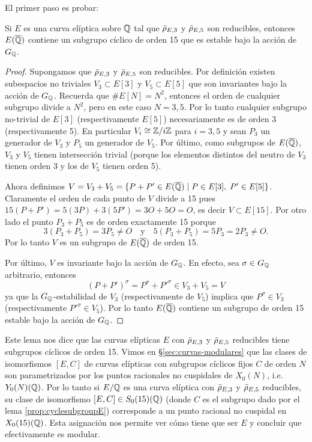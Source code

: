 El primer paso es probar:

\begin{lema}\label{prop:cyclesubgroupE}%
	  Si $E$ es una curva el\'iptica sobre $\mathbb{Q}$ tal que $\bar{\rho}_{E,3}$ y $\bar{\rho}_{E,5}$ son reducibles, entonces $E(\overline{\mathbb{Q}})$ contiene un subgrupo cíclico de orden 15 que es estable bajo la acción de $G_{\mathbb{Q}}$.
\end{lema}

\begin{proof}
  Supongamos que $\bar{\rho}_{E,3}$ y $\bar{\rho}_{E,5}$ son reducibles. Por definici\'on existen subespacios no triviales $V_3\subset E[3]$ y $V_5\subset E[5]$ que son invariantes bajo la acci\'on de $G_{\mathbb{Q}}$. Recuerda que $\# E[N]=N^2$, entonces el orden de cualquier subgrupo divide a $N^2$, pero en este caso $N=3,5$. Por lo tanto cualquier subgrupo no-trivial de $E[3]$ (respectivamente $E[5]$) necesariamente es de orden 3 (respectivamente 5). En particular $V_i\cong \mathbb{Z}/i\mathbb{Z}$ para $i=3,5$ y sean $P_3$ un generador de $V_3$ y $P_5$ un generador de $V_5$. Por \'ultimo, como subgrupos de $E(\overline{\mathbb{Q}})$, $V_3$ y $V_5$ tienen intersecci\'on trivial (porque los elementos distintos del neutro de $V_3$ tienen orden 3 y los de $V_5$ tienen orden 5).
  
  Ahora definimos $V=V_3+V_5=\{P+P'\in E(\overline{\mathbb{Q}}) \mid P\in E[3],\; P'\in E[5]\}$. Claramente el orden de cada punto de $V$ divide a 15 pues $15(P+P')=5(3P)+3(5P')=3O+5O=O$, es decir $V\subset E[15]$. Por otro lado el punto $P_3+P_5$ es de orden exactamente 15 porque
  \[
    3(P_3+P_5)=3P_5\neq O \quad\mathrm{y}\quad 5(P_3+P_5)=5P_3=2P_3\neq O.
  \]
  Por lo tanto $V$ es un subgrupo de $E(\overline{\mathbb{Q}})$ de orden 15.

  Por \'ultimo, $V$ es invariante bajo la acci\'on de $G_{\mathbb{Q}}$. En efecto, sea $\sigma\in G_{\mathbb{Q}}$ arbitrario, entonces
  \[
    (P+P')^{\sigma}=P^{\sigma}+P'^{\sigma}\in V_3+V_5=V
  \]
  ya que la $G_{\mathbb{Q}}$-estabilidad de $V_3$ (respectivamente de $V_5$) implica que $P^{\sigma}\in V_3$ (respectivamente $P'^{\sigma}\in V_5$). Por lo tanto $E(\overline{\mathbb{Q}})$ contiene un subgrupo de orden 15 estable bajo la acci\'on de $G_{\mathbb{Q}}$.
\end{proof}

Este lema nos dice que las curvas elípticas $E$ con $\bar{\rho}_{E,3}$ y $\bar{\rho}_{E,5}$ reducibles tiene subgrupos cíclicos de orden 15. Vimos en \S\ref{sec:curvas-modulares} que las clases de isomorfismos $[E,C]$ de curvas elípticas con subgrupos cíclicos fijos $C$ de orden $N$ son parametrizados por los puntos racionales no cuspidales de $X_0(N)$, i.e. $Y_0(N)(\mathbb{Q})$. Por lo tanto si $E/\mathbb{Q}$ es una curva elíptica con $\bar{\rho}_{E,3}$ y $\bar{\rho}_{E,5}$ reducibles, su clase de isomorfismo $[E,C]\in S_0(15)(\mathbb{Q})$ (donde $C$ es el subgrupo dado por el lema \ref{prop:cyclesubgroupE}) corresponde a un punto racional no cuspidal en $X_0(15)(\mathbb{Q})$. Esta asignación nos permite ver cómo tiene que ser $E$ y concluir que efectivamente es modular.

